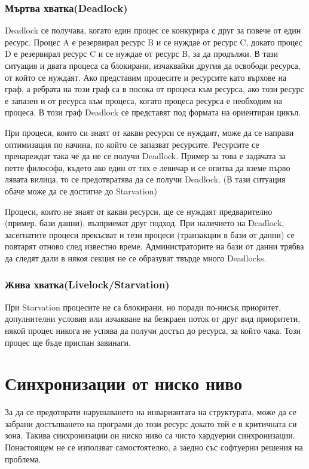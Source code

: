 \documentclass[fleqn,12pt]{article}
\begin{document}
\subsubsection{Мъртва хватка(Deadlock)}
    Deadlock се получава, когато един процес се конкурира с друг за повече от един ресурс. Процес A е резервирал ресурс B и се нуждае от ресурс C, докато процес D е резервирал ресурс C и се нуждае от ресурс B, за да продължи. В тази ситуация и двата процеса са блокирани, изчаквайки другия да освободи ресурса, от който се нуждаят. Ако представим процесите и ресурсите като върхове на граф, а ребрата на този граф са в посока от процеса към ресурса, ако този ресурс е запазен и от ресурса към процеса, когато процеса ресурса е необходим на процеса. В този граф Deadlock се представят под формата на ориентиран цикъл.

    При процеси, които си знаят от какви ресурси се нуждаят, може да се направи оптимизация по начина, по който се запазват ресурсите. Ресурсите се пренареждат така че да не се получи Deadlock. Пример за това е задачата за петте философа, където ако един от тях е левичар и се опитва да вземе първо лявата вилица, то се предотвратява да се получи Deadlock. (В тази ситуация обаче може да се достигне до Starvation)

    Процеси, които не знаят от какви ресурси, ще се нуждаят предварително (пример. бази данни), възприемат друг подход. При наличието на Deadlock, засегнатите процеси прекъсват и тези процеси (транзакции в бази от данни) се повтарят отново след известно време. Администраторите на бази от данни трябва да следят дали в някоя секция не се образуват твърде много Deadlocks. 


\subsubsection{Жива хватка(Livelock/Starvation)}
    При Starvation процесите не са блокирани, но поради по-нисък приоритет, допулнителни условия или изчакване на безкраен поток от друг вид приоритети, някой процес никога не успява да получи достъп до ресурса, за който чака. Този процес ще бъде приспан завинаги.


\section{Синхронизации от ниско ниво}
    За да се предотврати нарушаването на инвариантата на структурата, може да се забрани достъпването на програми до този ресурс докато той е в критичната си зона. Такива синхронизации он ниско ниво са чисто хардуерни синхронизации. Понастоящем не се използват самостоятелно, а заедно със софтуерни решения на проблема.
\end{document}
